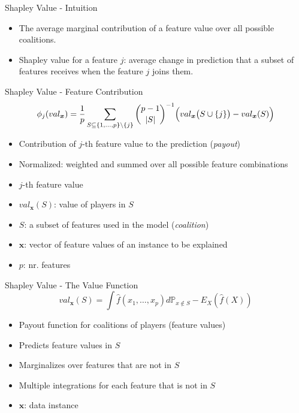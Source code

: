 \begin{frame}{Shapley Value - Intuition}
	\begin{itemize}
		\item The average marginal contribution of a feature value over all possible coalitions.
		\item Shapley value for a feature $j$: average change in prediction that a subset of features receives when the feature $j$ joins them.
	\end{itemize}
\end{frame}
\begin{frame}{Shapley Value - Feature Contribution}
\begin{equation}
	\phi_j(val_{\bm{x}})=\frac{1}{p}\sum_{S\subseteq\{1,\ldots,p\} \backslash \{j\}}\binom{p-1}{|S|}^{-1}\Bigl(val_{\bm{x}}\bigl(S\cup\{j\}\bigr)-val_{\bm{x}}(S)\Bigr)
\end{equation}
\begin{itemize}
	\item Contribution of $j$-th feature value to the prediction (\emph{payout})
	\item Normalized: weighted and summed over all possible feature combinations
	\item $j$-th feature value
	\item $val_{\bm{x}}(S)$: value of players in $S$ %
	\item $S$: a subset of features used in the model (\emph{coalition})
	\item $\bm{x}$: vector of feature values of an instance to be explained
	\item $p$: nr. features
\end{itemize}
\end{frame}
\begin{frame}{Shapley Value - The Value Function}
\begin{equation}
	val_{\bm{x}}(S)=\int\hat{f}(x_{1},\ldots,x_{p})d\mathbb{P}_{x\notin{}S}-E_X(\hat{f}(X))
\end{equation}
\begin{itemize}
	\item Payout function for coalitions of players (feature values)
	\item Predicts feature values in $S$
	\item Marginalizes over features that are not in $S$
	\item Multiple integrations for each feature that is not in $S$
	\item $\bm{x}$: data instance
\end{itemize}
\end{frame}

